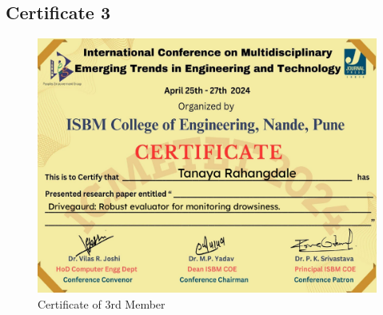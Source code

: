 \documentclass[12pt]{article}
\begin{document}
\subsection{Certificate 3}
\begin{figure}[htbp]
    \centering
    \includegraphics[width=1\textwidth]{tanaya.pdf} 
    \caption{Certificate of 3rd Member}
\end{figure}
\FloatBarrier
\end{document}

